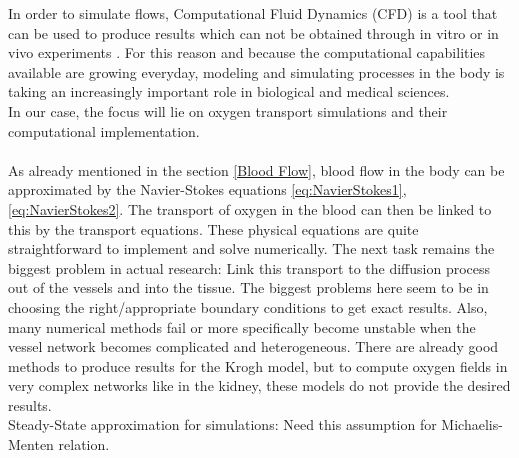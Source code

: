 In order to simulate flows, Computational Fluid Dynamics (CFD) is a tool that can be used to produce results which can not be obtained through in vitro or in vivo experiments  \cite{mathmodeling}. For this reason and because the computational capabilities available are growing everyday, modeling and simulating processes in the body is taking an increasingly important role in biological and medical sciences.
\\In our case, the focus will lie on oxygen transport simulations and their computational implementation.\\
\\As already mentioned in the section \ref{Blood Flow}, blood flow in the body can be approximated by the Navier-Stokes equations \ref{eq:NavierStokes1}, \ref{eq:NavierStokes2}. The transport of oxygen in the blood can then be linked to this by the transport equations. These physical equations are quite straightforward to implement and solve numerically. The next task remains the biggest problem in actual research: Link this transport to the diffusion process out of the vessels and into the tissue. The biggest problems here seem to be in choosing the right/appropriate boundary conditions to get exact results. Also, many numerical methods fail or more specifically become unstable when the vessel network becomes complicated and heterogeneous. There are already good methods to produce results for the Krogh model, but to compute oxygen fields in very complex networks like in the kidney, these models do not provide the desired results.
\\Steady-State approximation for simulations: Need this assumption for Michaelis-Menten relation.




